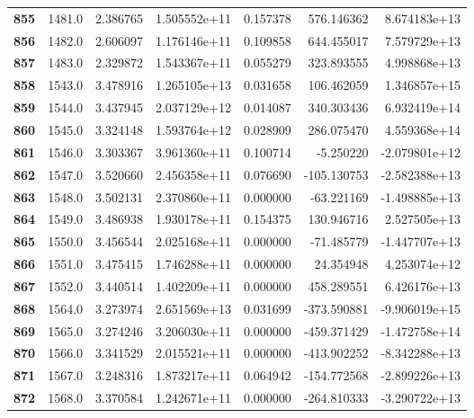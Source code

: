\documentclass{report}[12pt]
\begin{document}
\begin{center}
\begin{tabular}{lrrrrrr}
\textbf{855 } &         1481.0 &   2.386765 &  1.505552e+11 &    0.157378 &   576.146362 &  8.674183e+13 \\
\textbf{856 } &         1482.0 &   2.606097 &  1.176146e+11 &    0.109858 &   644.455017 &  7.579729e+13 \\
\textbf{857 } &         1483.0 &   2.329872 &  1.543367e+11 &    0.055279 &   323.893555 &  4.998868e+13 \\
\textbf{858 } &         1543.0 &   3.478916 &  1.265105e+13 &    0.031658 &   106.462059 &  1.346857e+15 \\
\textbf{859 } &         1544.0 &   3.437945 &  2.037129e+12 &    0.014087 &   340.303436 &  6.932419e+14 \\
\textbf{860 } &         1545.0 &   3.324148 &  1.593764e+12 &    0.028909 &   286.075470 &  4.559368e+14 \\
\textbf{861 } &         1546.0 &   3.303367 &  3.961360e+11 &    0.100714 &    -5.250220 & -2.079801e+12 \\
\textbf{862 } &         1547.0 &   3.520660 &  2.456358e+11 &    0.076690 &  -105.130753 & -2.582388e+13 \\
\textbf{863 } &         1548.0 &   3.502131 &  2.370860e+11 &    0.000000 &   -63.221169 & -1.498885e+13 \\
\textbf{864 } &         1549.0 &   3.486938 &  1.930178e+11 &    0.154375 &   130.946716 &  2.527505e+13 \\
\textbf{865 } &         1550.0 &   3.456544 &  2.025168e+11 &    0.000000 &   -71.485779 & -1.447707e+13 \\
\textbf{866 } &         1551.0 &   3.475415 &  1.746288e+11 &    0.000000 &    24.354948 &  4.253074e+12 \\
\textbf{867 } &         1552.0 &   3.440514 &  1.402209e+11 &    0.000000 &   458.289551 &  6.426176e+13 \\
\textbf{868 } &         1564.0 &   3.273974 &  2.651569e+13 &    0.031699 &  -373.590881 & -9.906019e+15 \\
\textbf{869 } &         1565.0 &   3.274246 &  3.206030e+11 &    0.000000 &  -459.371429 & -1.472758e+14 \\
\textbf{870 } &         1566.0 &   3.341529 &  2.015521e+11 &    0.000000 &  -413.902252 & -8.342288e+13 \\
\textbf{871 } &         1567.0 &   3.248316 &  1.873217e+11 &    0.064942 &  -154.772568 & -2.899226e+13 \\
\textbf{872 } &         1568.0 &   3.370584 &  1.242671e+11 &    0.000000 &  -264.810333 & -3.290722e+13 \\

\end{tabular}
\end{center}
\end{document}
